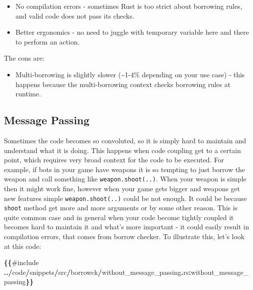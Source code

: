 \documentclass[
]{book}
\newenvironment{Shaded}{\begin{snugshade}}{\end{snugshade}}
\newcommand{\NormalTok}[1]{#1}
\newcommand{\OperatorTok}[1]{\textcolor[rgb]{0.81,0.36,0.00}{\textbf{#1}}}
\providecommand{\tightlist}{%
  \setlength{\itemsep}{0pt}\setlength{\parskip}{0pt}}
\theoremstyle{definition}
\theoremstyle{definition}
\theoremstyle{definition}
\theoremstyle{definition}
\theoremstyle{remark}
\begin{document}
\begin{itemize}
\tightlist
\item
  No compilation errors - sometimes Rust is too strict about borrowing rules, and valid code does not pass its checks.
\item
  Better ergonomics - no need to juggle with temporary variable here and there to perform an action.
\end{itemize}

The cons are:

\begin{itemize}
\tightlist
\item
  Multi-borrowing is slightly slower (\textasciitilde1-4\% depending on your use case) - this happens because the multi-borrowing context checks borrowing rules at runtime.
\end{itemize}

\subsection{Message Passing}\label{message-passing}

Sometimes the code becomes so convoluted, so it is simply hard to maintain and understand what it is doing. This happens when code coupling get to a certain point, which requires very broad context for the code to be executed. For example, if bots in your game have weapons it is so tempting to just borrow the weapon and call something like \texttt{weapon.shoot(..)}. When your weapon is simple then it might work fine, however when your game gets bigger and weapons get new features simple \texttt{weapon.shoot(..)} could be not enough. It could be because \texttt{shoot} method get more and more arguments or by some other reason. This is quite common case and in general when your code become tightly coupled it becomes hard to maintain it and what's more important - it could easily result in compilation errors, that comes from borrow checker. To illustrate this, let's look at this code:

\begin{Shaded}
\begin{Highlighting}[]
\OperatorTok{\{\{}\NormalTok{\#include }\OperatorTok{../}\NormalTok{code}\OperatorTok{/}\NormalTok{snippets}\OperatorTok{/}\NormalTok{src}\OperatorTok{/}\NormalTok{borrowck}\OperatorTok{/}\NormalTok{without\_message\_passing}\OperatorTok{.}\NormalTok{rs}\OperatorTok{:}\NormalTok{without\_message\_passing}\OperatorTok{\}\}}
\end{Highlighting}
\end{Shaded}
\end{document}
